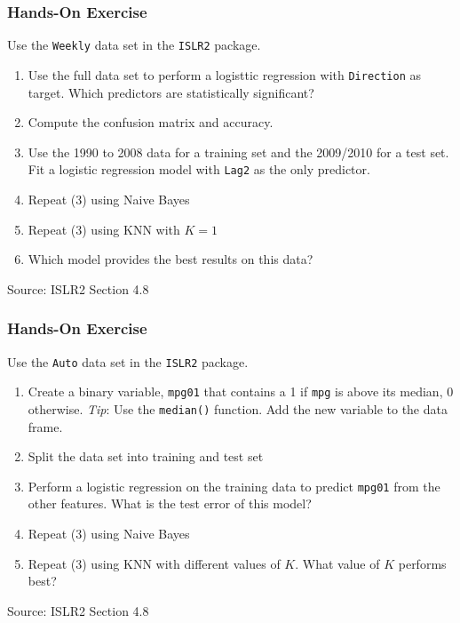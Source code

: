 \begin{tcolorbox}[colback=code]
\subsubsection*{Hands-On Exercise} 

Use the \texttt{Weekly} data set in the \texttt{ISLR2} package.
\begin{enumerate}
   \item Use the full data set to perform a logisttic regression with \texttt{Direction} as target. Which predictors are statistically significant?
   \item Compute the confusion matrix and accuracy.
   \item Use the 1990 to 2008 data for a training set and the 2009/2010 for a test set. Fit a logistic regression model with \texttt{Lag2} as the only predictor.
   \item Repeat (3) using Naive Bayes
   \item Repeat (3) using KNN with $K=1$
   \item Which model provides the best results on this data?
\end{enumerate}
{\footnotesize \vspace{\baselineskip} Source: ISLR2 Section 4.8}
\end{tcolorbox}

\begin{tcolorbox}[colback=code]
\subsubsection*{Hands-On Exercise} 
Use the \texttt{Auto} data set in the \texttt{ISLR2} package.
\begin{enumerate}
   \item Create a binary variable, \texttt{mpg01} that contains a 1 if \texttt{mpg} is above its median, 0 otherwise. \emph{Tip}: Use the \texttt{median()} function. Add the new variable to the data frame.
   \item Split the data set into training and test set
   \item Perform a logistic regression on the training data to predict \texttt{mpg01} from the other features. What is the test error of this model?
   \item Repeat (3) using Naive Bayes
   \item Repeat (3) using KNN with different values of $K$. What value of $K$ performs best?
\end{enumerate}
{\footnotesize \vspace{\baselineskip} Source: ISLR2 Section 4.8}
\end{tcolorbox}

